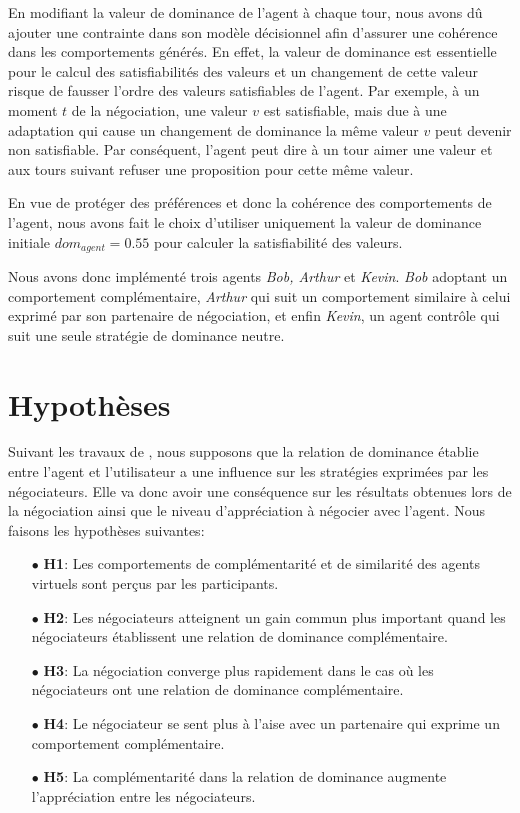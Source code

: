 En modifiant la valeur de dominance de l'agent à chaque tour, nous avons dû ajouter une contrainte dans son modèle décisionnel afin d'assurer une cohérence dans les comportements générés. 
En effet, la valeur de dominance est essentielle pour le calcul des satisfiabilités des valeurs et un changement de cette valeur risque de fausser l'ordre des valeurs satisfiables de l'agent.
Par exemple, à un moment $t$ de la négociation, une valeur $v$ est satisfiable, mais due à une adaptation qui cause un changement de dominance la même valeur $v$ peut devenir non satisfiable. Par conséquent, l'agent peut dire à un tour aimer une valeur et aux tours suivant refuser une proposition pour cette même valeur.

En vue de protéger des préférences et donc la cohérence des comportements de l'agent, nous avons fait le choix d'utiliser uniquement la valeur de dominance initiale $dom_{agent} = 0.55$ pour calculer la satisfiabilité des valeurs.

Nous avons donc implémenté trois agents \emph{Bob, Arthur} et \emph{Kevin}. \emph{Bob} adoptant un comportement complémentaire, \emph{Arthur} qui suit un comportement similaire à celui exprimé par son partenaire de négociation, et enfin \emph{Kevin}, un agent contrôle qui suit une seule stratégie de dominance neutre. 

\section{Hypothèses}
\label{sec:H}

Suivant les travaux de \cite{tiedens2003power,dryer1997opposites,wiltermuth2015benefits}, nous supposons que la relation de dominance établie entre l'agent et l'utilisateur a une influence sur les stratégies exprimées par les négociateurs. Elle va donc avoir une conséquence sur les résultats obtenues lors de la négociation ainsi que le niveau d'appréciation à négocier avec l'agent.
Nous faisons les hypothèses suivantes: 
\begin{itemize}
	\item [$\bullet$] \textbf{H1}: Les comportements de complémentarité et de similarité des agents virtuels sont perçus par les participants.
	\item [$\bullet$] \textbf{H2}: Les négociateurs atteignent un gain commun plus important quand les négociateurs établissent une relation de dominance complémentaire.
	\item [$\bullet$] \textbf{H3}: La négociation converge plus rapidement dans le cas où les négociateurs ont une relation de dominance complémentaire. 
	\item [$\bullet$] \textbf{H4}: Le négociateur se sent plus à l'aise avec un partenaire qui exprime un comportement complémentaire.
	\item [$\bullet$] \textbf{H5}: La complémentarité dans la relation de dominance augmente l'appréciation entre les négociateurs.
\end{itemize}



